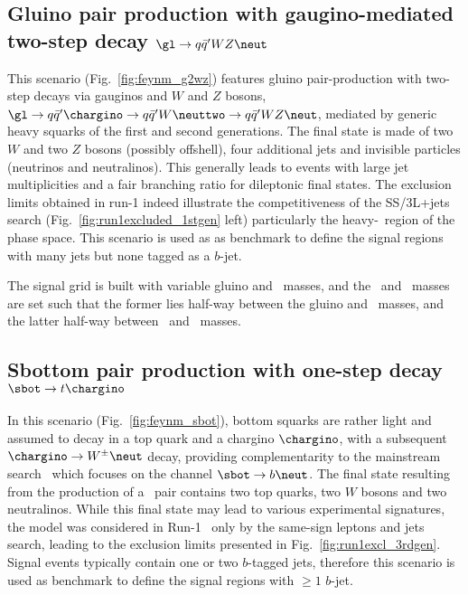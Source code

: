 \subsection{Gluino pair production with gaugino-mediated two-step decay $\gl\to q\bar q'WZ\neut$}
\label{subsec:signals_g2wz}

This scenario (Fig.~\ref{fig:feynm_g2wz}) features gluino pair-production with two-step decays via gauginos and $W$ and $Z$ bosons, 
$\gl\to q\bar{q}'\chargino\to q\bar{q}'W\neuttwo\to q\bar{q}'WZ\neut$, 
mediated by generic heavy squarks of the first and second generations. 
The final state is made of two $W$ and two $Z$ bosons (possibly offshell), 
four additional jets and invisible particles (neutrinos and neutralinos). 
This generally leads to events with large jet multiplicities and a fair branching ratio for dileptonic final states. 
The exclusion limits obtained in run-1 indeed illustrate the competitiveness of the SS/3L+jets search (Fig.~\ref{fig:run1excluded_1stgen} left)
particularly the heavy-\neut\ region of the phase space. 
This scenario is used as as benchmark to define the signal regions with many jets but none tagged as a $b$-jet. 

The signal grid is built with variable gluino and \neut\ masses, 
and the \chargino\ and \neuttwo\ masses are set such that the former lies half-way between the gluino and \neut\ masses, 
and the latter half-way between \chargino\ and \neut\ masses. 

\subsection{Sbottom pair production with one-step decay $\sbot\to t\chargino$}
\label{subsec:signals_sbot}

In this scenario (Fig.~\ref{fig:feynm_sbot}), bottom squarks are rather light and assumed to decay in a top quark and a chargino $\chargino$, 
with a subsequent $\chargino\to W^\pm\neut$ decay, 
providing complementarity to the mainstream search~\cite{ATLAS-CONF-2015-066} which focuses on the channel $\sbot\to b\neut$. 
The final state resulting from the production of a \sbsb\ pair contains two top quarks, two $W$ bosons and two neutralinos. 
While this final state may lead to various experimental signatures, 
the model was considered in Run-1~\cite{DraftSquarkGluinoSummaryPaper} 
only by the same-sign leptons and jets search, leading to the exclusion limits presented in Fig.~\ref{fig:run1excl_3rdgen}. 
Signal events typically contain one or two $b$-tagged jets, 
therefore this scenario is used as benchmark to define the signal regions with $\ge 1$ $b$-jet. 

